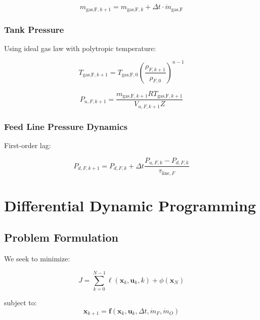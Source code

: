 \documentclass[11pt,a4paper]{article}
\begin{document}
\begin{equation}
m_{\text{gas,F},k+1} = m_{\text{gas,F},k} + \Delta t \cdot \dot{m}_{\text{gas,F}}
\end{equation}

\subsubsection{Tank Pressure}

Using ideal gas law with polytropic temperature:

\begin{equation}
T_{\text{gas,F},k+1} = T_{\text{gas,F},0} \left(\frac{\rho_{F,k+1}}{\rho_{F,0}}\right)^{n-1}
\end{equation}

\begin{equation}
P_{u,F,k+1} = \frac{m_{\text{gas,F},k+1} R T_{\text{gas,F},k+1}}{V_{u,F,k+1} Z}
\end{equation}

\subsubsection{Feed Line Pressure Dynamics}

First-order lag:

\begin{equation}
P_{d,F,k+1} = P_{d,F,k} + \Delta t \frac{P_{u,F,k} - P_{d,F,k}}{\tau_{\text{line},F}}
\end{equation}

\section{Differential Dynamic Programming}

\subsection{Problem Formulation}

We seek to minimize:

\begin{equation}
J = \sum_{k=0}^{N-1} \ell(\mathbf{x}_k, \mathbf{u}_k, k) + \phi(\mathbf{x}_N)
\end{equation}

subject to:
\begin{equation}
\mathbf{x}_{k+1} = \mathbf{f}(\mathbf{x}_k, \mathbf{u}_k, \Delta t, \dot{m}_F, \dot{m}_O)
\end{equation}
\end{document}
